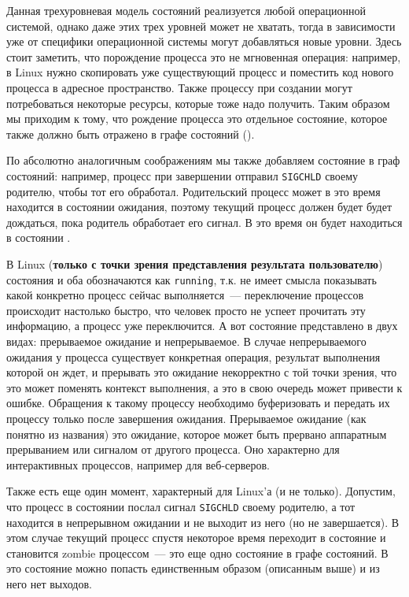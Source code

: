 
Данная трехуровневая модель состояний реализуется любой операционной системой,
однако даже этих трех уровней может не хватать, тогда в зависимости уже от
специфики операционной системы могут добавляться новые уровни. Здесь стоит
заметить, что порождение процесса это не мгновенная операция: например, в Linux
нужно скопировать уже существующий процесс и поместить код нового процесса в
адресное пространство. Также процессу при создании могут потребоваться некоторые
ресурсы, которые тоже надо получить. Таким образом мы приходим к тому, что
рождение процесса это отдельное состояние, которое также должно быть отражено в
графе состояний ().


По абсолютно аналогичным соображениям мы также добавляем состояние
 в граф состояний: например, процесс при завершении отправил
\texttt{SIGCHLD} своему родителю, чтобы тот его обработал. Родительский процесс
может в это время находится в состоянии ожидания, поэтому текущий процесс должен
будет будет дождаться, пока родитель обработает его сигнал. В это время он будет
находиться в состоянии .

В Linux (\textbf{только с точки зрения представления результата пользователю})
состояния  и  оба обозначаются как
\texttt{running}, т.к. не имеет смысла показывать какой конкретно процесс сейчас
выполняется~--- переключение процессов происходит настолько быстро, что человек
просто не успеет прочитать эту информацию, а процесс уже переключится. А вот
состояние  представлено в двух видах: прерываемое ожидание и
непрерываемое. В случае непрерываемого ожидания у процесса существует конкретная
операция, результат выполнения которой он ждет, и прерывать это ожидание
некорректно с той точки зрения, что это может поменять контекст выполнения, а
это в свою очередь может привести к ошибке. Обращения к такому процессу
необходимо буферизовать и передать их процессу только после завершения ожидания.
Прерываемое ожидание (как понятно из названия) это ожидание, которое может быть
прервано аппаратным прерыванием или сигналом от другого процесса. Оно характерно
для интерактивных процессов, например для веб-серверов.

Также есть еще один момент, характерный для Linux'а (и не только). Допустим, что
процесс в состоянии  послал сигнал \texttt{SIGCHLD} своему
родителю, а тот находится в непрерывном ожидании и не выходит из него (но не
завершается). В этом случае текущий процесс спустя некоторое время переходит в
состояние  и становится zombie процессом~--- это еще одно состояние
в графе состояний. В это состояние можно попасть единственным образом (описанным
выше) и из него нет выходов.

